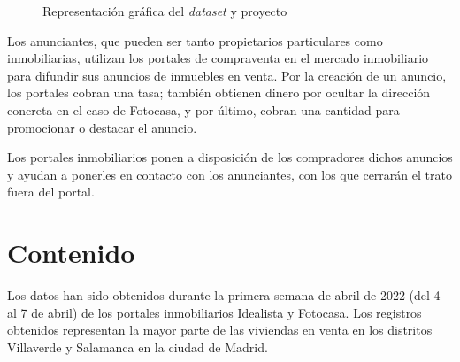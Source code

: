 \documentclass[12pt]{article}
\begin{document}
\begin{figure}[h]
	\centering
	\caption{Representación gráfica del \textit{dataset} y proyecto}
\end{figure}

Los anunciantes, que pueden ser tanto propietarios particulares como inmobiliarias, utilizan los portales de compraventa en el mercado inmobiliario para difundir sus anuncios de inmuebles en venta. Por la creación de un anuncio, los portales cobran una tasa; también obtienen dinero por ocultar la dirección concreta en el caso de Fotocasa, y por último, cobran una cantidad para promocionar o destacar el anuncio.

Los portales inmobiliarios ponen a disposición de los compradores dichos anuncios y ayudan a ponerles en contacto con los anunciantes, con los que cerrarán el trato fuera del portal.

\newpage

\vspace{-1.5em}\section{Contenido}\vspace{-1.0em}


Los datos han sido obtenidos durante la primera semana de abril de 2022 (del 4 al 7 de abril) de los portales inmobiliarios Idealista y Fotocasa. Los registros obtenidos representan la mayor parte de las viviendas en venta en los distritos Villaverde y Salamanca en la ciudad de Madrid.
\end{document}
